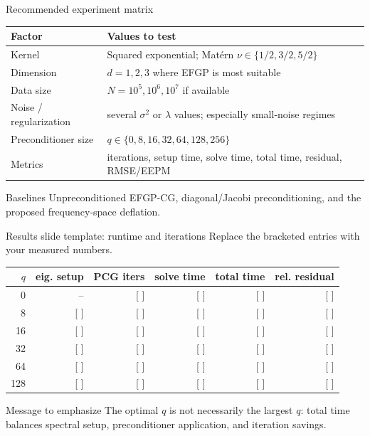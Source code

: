 \documentclass[aspectratio=169,10pt]{beamer}
\begin{document}
\begin{frame}{Recommended experiment matrix}
\small
\begin{center}
\begin{tabular}{>{\raggedright}p{}p{}}
\toprule
Factor & Values to test \\
\midrule
Kernel & Squared exponential; Mat\'ern $\nu\in\{1/2,3/2,5/2\}$ \\
Dimension & $d=1,2,3$ where EFGP is most suitable \\
Data size & $N=10^5,10^6,10^7$ if available \\
Noise / regularization & several $\sigma^2$ or $\lambda$ values; especially small-noise regimes \\
Preconditioner size & $q\in\{0,8,16,32,64,128,256\}$ \\
Metrics & iterations, setup time, solve time, total time, residual, RMSE/EEPM \\
\bottomrule
\end{tabular}
\end{center}

\begin{block}{Baselines}
Unpreconditioned EFGP-CG, diagonal/Jacobi preconditioning, and the proposed frequency-space deflation.
\end{block}
\end{frame}

\begin{frame}{Results slide template: runtime and iterations}
\small
Replace the bracketed entries with your measured numbers.
\begin{center}
\begin{tabular}{rrrrrr}
\toprule
$q$ & eig. setup & PCG iters & solve time & total time & rel. residual \\
\midrule
0   & --      & [ ] & [ ] & [ ] & [ ] \\
8   & [ ]     & [ ] & [ ] & [ ] & [ ] \\
16  & [ ]     & [ ] & [ ] & [ ] & [ ] \\
32  & [ ]     & [ ] & [ ] & [ ] & [ ] \\
64  & [ ]     & [ ] & [ ] & [ ] & [ ] \\
128 & [ ]     & [ ] & [ ] & [ ] & [ ] \\
\bottomrule
\end{tabular}
\end{center}

\begin{block}{Message to emphasize}
The optimal $q$ is not necessarily the largest $q$: total time balances spectral setup, preconditioner application, and iteration savings.
\end{block}
\end{frame}
\end{document}
